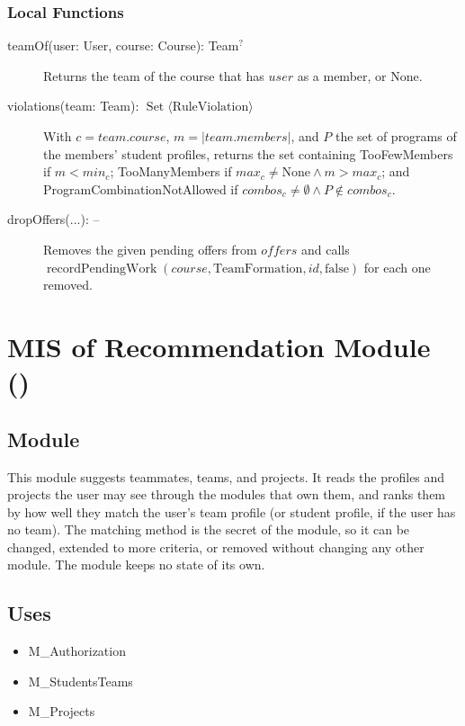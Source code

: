 \documentclass[12pt, titlepage]{article}
\newcommand{\moduleid}[1]{\texttt{\detokenize{#1}}}
\begin{document}
\subsubsection{Local Functions}

\begin{description}
    \item[teamOf(user: User, course: Course): Team$^{?}$] Returns the team of the course that has $user$ as a member, or None.
    \item[violations(team: Team): $\operatorname{Set}\langle\text{RuleViolation}\rangle$] With $c=team.course$, $m=|team.members|$, and $P$ the set of programs of the members' student profiles, returns the set containing TooFewMembers if $m<\mathit{min}_c$; TooManyMembers if $\mathit{max}_c\ne\text{None}\land m>\mathit{max}_c$; and ProgramCombinationNotAllowed if $\mathit{combos}_c\ne\emptyset\land P\notin\mathit{combos}_c$.
    \item[dropOffers(...): --] Removes the given pending offers from $\mathit{offers}$ and calls $\operatorname{recordPendingWork}(course,\text{TeamFormation},id,\text{false})$ for each one removed.
\end{description}

\newpage

\section[MIS of Recommendation Module]{MIS of Recommendation Module (\moduleid{M_Recommendation})}
\label{M_Recommendation}

\subsection{Module}

This module suggests teammates, teams, and projects. It reads the profiles and projects the user may see through the modules that own them, and ranks them by how well they match the user's team profile (or student profile, if the user has no team). The matching method is the secret of the module, so it can be changed, extended to more criteria, or removed without changing any other module. The module keeps no state of its own.

\subsection{Uses}

\begin{itemize}
    \item M\_Authorization
    \item M\_StudentsTeams
    \item M\_Projects
\end{itemize}
\end{document}
